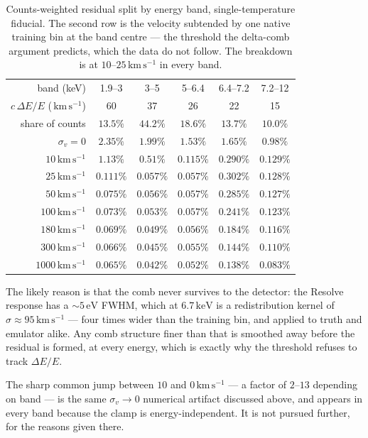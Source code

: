 \documentclass[11pt,a4paper]{article}
\newcommand{\kev}{\,\mathrm{keV}}
\newcommand{\kms}{\,\mathrm{km\,s^{-1}}}
\begin{document}
\begin{table}[ht]
\centering
\begin{tabular}{rccccc}
\toprule
band (keV) & 1.9--3 & 3--5 & 5--6.4 & 6.4--7.2 & 7.2--12\\
$c\,\Delta E/E$ ($\kms$) & 60 & 37 & 26 & 22 & 15\\
share of counts & $13.5\%$ & $44.2\%$ & $18.6\%$ & $13.7\%$ & $10.0\%$\\
\midrule
$\sigma_v = 0$ & $2.35\%$ & $1.99\%$ & $1.53\%$ & $1.65\%$ & $0.98\%$\\
$10\kms$   & $1.13\%$  & $0.51\%$  & $0.115\%$ & $0.290\%$ & $0.129\%$\\
$25\kms$   & $0.111\%$ & $0.057\%$ & $0.057\%$ & $0.302\%$ & $0.128\%$\\
$50\kms$   & $0.075\%$ & $0.056\%$ & $0.057\%$ & $0.285\%$ & $0.127\%$\\
$100\kms$  & $0.073\%$ & $0.053\%$ & $0.057\%$ & $0.241\%$ & $0.123\%$\\
$180\kms$  & $0.069\%$ & $0.049\%$ & $0.056\%$ & $0.184\%$ & $0.116\%$\\
$300\kms$  & $0.066\%$ & $0.045\%$ & $0.055\%$ & $0.144\%$ & $0.110\%$\\
$1000\kms$ & $0.065\%$ & $0.042\%$ & $0.052\%$ & $0.138\%$ & $0.083\%$\\
\bottomrule
\end{tabular}
\caption{Counts-weighted residual split by energy band, single-temperature
fiducial. The second row
is the velocity subtended by one native training bin at the band centre
--- the threshold the delta-comb argument predicts, which the data do
not follow. The breakdown is at $10$--$25\kms$ in every band.}
\label{tab:lowvband}
\end{table}

The likely reason is that the comb never survives to the detector: the
Resolve response has a $\sim5\,\mathrm{eV}$ FWHM, which at $6.7\kev$ is
a redistribution kernel of $\sigma \approx 95\kms$ --- four times wider
than the training bin, and applied to truth and emulator alike. Any
comb structure finer than that is smoothed away before the residual is
formed, at every energy, which is exactly why the threshold refuses to
track $\Delta E/E$.

The sharp common jump between $10$ and $0\kms$ --- a factor of $2$--$13$
depending on band --- is the same $\sigma_v \to 0$ numerical artifact
discussed above, and appears in every band because the clamp is
energy-independent. It is not pursued further, for the reasons given
there.
\end{document}
